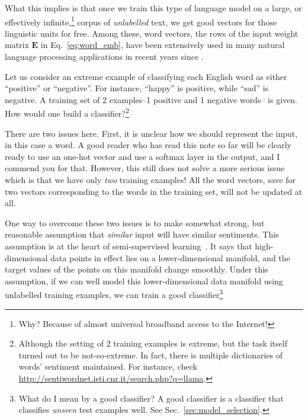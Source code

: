 \documentclass{report}
\newcommand{\matr}[1]{\mathbf{#1}}
\newcommand{\mE}[0]{\matr{E}}
\begin{document}
What this implies is that once we train this type of language model on a large,
or effectively infinite,\footnote{
    Why? Because of almost universal broadband access to the Internet!
}
corpus of {\em unlabelled} text, we get good vectors for those linguistic units
for free. Among these, word vectors, the rows of the input weight matrix $\mE$
in Eq.~\eqref{eq:word_emb}, have been extensively used in many natural language
processing applications in recent years since
\cite{turian2010word,collobert2011natural,mikolov2013efficient}.

Let us consider an extreme example of classifying each English word as either
``positive'' or ``negative''. For instance, ``happy'' is positive, while ``sad''
is negative. A training set of 2 examples--1 positive and 1 negative words-- is
given. How would one build a classifier?\footnote{
    Although the setting of 2 training examples is extreme, but the task itself
    turned out to be not-so-extreme. In fact, there is multiple dictionaries of
    words' sentiment maintained. For instance, check
    \url{http://sentiwordnet.isti.cnr.it/search.php?q=llama}.
}

There are two issues here. First, it is unclear how we should represent the
input, in this case a word. A good reader who has read this note so far will be
clearly ready to use an one-hot vector and use a softmax layer in the output,
and I commend you for that. However, this still does not solve a more serious
issue which is that we have only {\em two} training examples!  All the word
vectors, save for two vectors corresponding to the words in the training set,
will not be updated at all.

One way to overcome these two issues is to make somewhat strong, but reasonable
assumption that {\em similar} input will have similar sentiments. This
assumption is at the heart of semi-supervised learning~\cite{Chapelle2006}. It
says that high-dimensional data points in effect lies on a lower-dimensional
manifold, and the target values of the points on this manifold change smoothly.
Under this assumption, if we can well model this lower-dimensional data manifold
using unlabelled training examples, we can train a good classifier\footnote{
    What do I mean by a good classifier? A good classifier is a classifier that
    classifies {\em unseen} test examples well. See
    Sec.~\ref{sec:model_selection}.
} 
\end{document}
